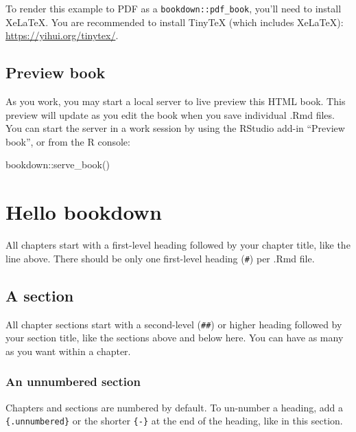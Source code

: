 \documentclass[
]{book}
\newenvironment{Shaded}{\begin{snugshade}}{\end{snugshade}}
\newcommand{\FunctionTok}[1]{\textcolor[rgb]{0.00,0.00,0.00}{#1}}
\newcommand{\NormalTok}[1]{#1}
\newcommand{\SpecialCharTok}[1]{\textcolor[rgb]{0.00,0.00,0.00}{#1}}
\theoremstyle{definition}
\theoremstyle{definition}
\theoremstyle{definition}
\theoremstyle{definition}
\theoremstyle{remark}
\begin{document}
To render this example to PDF as a \texttt{bookdown::pdf\_book}, you'll need to install XeLaTeX. You are recommended to install TinyTeX (which includes XeLaTeX): \url{https://yihui.org/tinytex/}.

\hypertarget{preview-book}{%
\section{Preview book}\label{preview-book}}

As you work, you may start a local server to live preview this HTML book. This preview will update as you edit the book when you save individual .Rmd files. You can start the server in a work session by using the RStudio add-in ``Preview book'', or from the R console:

\begin{Shaded}
\begin{Highlighting}[]
\NormalTok{bookdown}\SpecialCharTok{::}\FunctionTok{serve\_book}\NormalTok{()}
\end{Highlighting}
\end{Shaded}

\hypertarget{hello-bookdown}{%
\chapter{Hello bookdown}\label{hello-bookdown}}

All chapters start with a first-level heading followed by your chapter title, like the line above. There should be only one first-level heading (\texttt{\#}) per .Rmd file.

\hypertarget{a-section}{%
\section{A section}\label{a-section}}

All chapter sections start with a second-level (\texttt{\#\#}) or higher heading followed by your section title, like the sections above and below here. You can have as many as you want within a chapter.

\hypertarget{an-unnumbered-section}{%
\subsection*{An unnumbered section}\label{an-unnumbered-section}}

Chapters and sections are numbered by default. To un-number a heading, add a \texttt{\{.unnumbered\}} or the shorter \texttt{\{-\}} at the end of the heading, like in this section.
\end{document}
